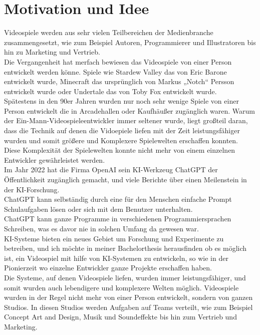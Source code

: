 \section{Motivation und Idee}
Videospiele werden aus sehr vielen Teilbereichen der Medienbranche zusammengesetzt, wie zum Beispiel Autoren, Programmierer und Illustratoren bis hin zu Marketing und Vertrieb.
\\
Die Vergangenheit hat merfach bewiesen das Videospiele von einer Person entwickelt werden könne. Spiele wie Stardew Valley das von Eric Barone entwickelt wurde, Minecraft das ursprünglich von Markus „Notch“ Persson entwickelt wurde oder Undertale das von Toby Fox entwickelt wurde.
\\
Spätestens in den 90er Jahren wurden nur noch sehr wenige Spiele von einer Person entwickelt die in Arcadehallen oder Kaufhäußer zugänglich waren.
Warum der Ein-Mann-Videospieleentwickler immer seltener wurde, liegt großteil daran, dass die Technik auf denen die Vidoepiele liefen mit der Zeit leistungsfähiger wurden und somit größere und Komplexere Spielewelten erschaffen konnten.
\\
Diese Komplexität der Spielewelten konnte nicht mehr von einem einzelnen Entwickler gewährleistet werden.
\\
Im Jahr 2022 hat die Firma OpenAI sein KI-Werkzeug ChatGPT der Öffentlichkeit zugänglich gemacht, und viele Berichte über einen Meilenstein in der KI-Forschung.
\\
ChatGPT kann selbständig durch eine für den Menschen einfache Prompt Schulaufgaben lösen oder sich mit dem Benutzer unterhalten.
\\
ChatGPT kann ganze Programme in verschiedenen Programmiersprachen Schreiben, was es davor nie in solchen Umfang da gewesen war.
\\
KI-Systeme bieten ein neues Gebiet um Forschung und Experimente zu betreiben, und ich möchte in meiner Bachelorthesis herausfinden ob es möglich ist, ein Videospiel mit hilfe von KI-Systemen zu entwickeln, so wie in der Pionierzeit wo einzelne Entwickler ganze Projekte erschaffen haben.
\\ 
Die Systeme, auf denen Videospiele liefen, wurden immer leistungsfähiger, und somit wurden auch lebendigere und komplexere Welten möglich. Videospiele wurden in der Regel nicht mehr von einer Person entwickelt, sondern von ganzen Studios. In diesen Studios werden Aufgaben auf Teams verteilt, wie zum Beispiel Concept Art and Design, Musik und Soundeffekte bis hin zum Vertrieb und Marketing.
\\
